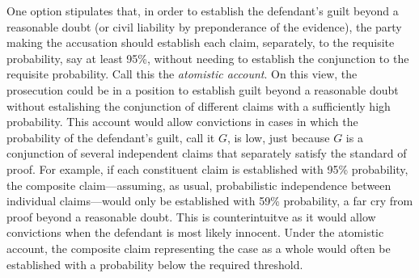 \documentclass[10pt,dvipsnames,enabledeprecatedfontcommands]{scrartcl}
\begin{document}
One option stipulates that, in order to establish the defendant's guilt
beyond a reasonable doubt (or civil liability by preponderance of the
evidence), the party making the accusation should establish each claim,
separately, to the requisite probability, say at least 95\%, without
needing to establish the conjunction to the requisite probability. Call
this the \textit{atomistic account}. On this view, the prosecution could
be in a position to establish guilt beyond a reasonable doubt without
estalishing the conjunction of different claims with a sufficiently high
probability. This account would allow convictions in cases in which the
probability of the defendant's guilt, call it \(G\), is low, just
because \(G\) is a conjunction of several independent claims that
separately satisfy the standard of proof. For example, if each
constituent claim is established with 95\% probability, the composite
claim---assuming, as usual, probabilistic independence between
individual claims---would only be established with 59\% probability, a
far cry from proof beyond a reasonable doubt. This is counterintuitve as
it would allow convictions when the defendant is most likely innocent.
Under the atomistic account, the composite claim representing the case
as a whole would often be established with a probability below the
required threshold.
\end{document}

